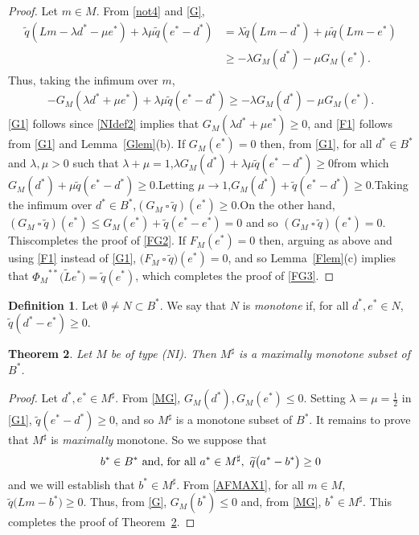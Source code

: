 \documentclass[letterpaper]{article}
\theoremstyle{plain}
\newtheorem{theorem}{Theorem}[section]
\theoremstyle{definition}
\newtheorem{definition}[theorem]{Definition}
\numberwithin{equation}{section}
\newcommand{\all}{\hbox{for all}}
\newcommand{\dbs}{^{**}}
\newcommand{\half}{{\textstyle\frac{1}{2}}}
\newcommand{\Lt}{{\wt L}}
\newcommand{\qt}{\wt q}
\newcommand{\ssquare}{\ \square\ }
\newcommand{\wt}{\widetilde}
\newcommand{\Def}{Definition~\ref}
\newcommand{\Lem}{Lemma~\ref}
\newcommand{\Thm}{Theorem~\ref}
\begin{document}
\begin{proof}
Let $m \in M$.   From \eqref{not4} and \eqref{G},
%
\begin{align*}
\qt(Lm - \lambda d^* - \mu e^*) + \lambda\mu\qt(e^* - d^*) &= \lambda\qt(Lm - d^*) + \mu\qt(Lm - e^*)\\
&\ge -\lambda G_M(d^*) - \mu G_M(e^*).
\end{align*}
%
Thus, taking the infimum over $m$,
%
\begin{align*}
-G_M(\lambda d^* + \mu e^*) + \lambda\mu\qt(e^* - d^*) \ge -\lambda G_M(d^*) - \mu G_M(e^*).
\end{align*}
%
\eqref{G1} follows since \eqref{NIdef2} implies that $G_M(\lambda d^* + \mu e^*) \ge 0$, and \eqref{F1} follows from \eqref{G1} and \Lem{Glem}(b).
If ${G_M}(e^*) = 0$ then, from \eqref{G1},  for all $d^* \in B^*$ and  $\lambda,\mu > 0$ such that $\lambda + \mu = 1$,\quad $\lambda G_M(d^*) + \lambda\mu\qt(e^* - d^*) \ge 0$\quad from which\quad $G_M(d^*) + \mu\qt(e^* - d^*) \ge 0$.\quad Letting $\mu \to 1$,\quad $G_M(d^*) + \qt(e^* - d^*) \ge 0$.\quad   Taking the infimum over $d^* \in B^*$,\quad $(G_M \ssquare \qt)(e^*) \ge 0$.\quad  On the other hand, $(G_M \ssquare \qt)(e^*) \le G_M(e^*) + \qt(e^* - e^*) = 0$ and so $(G_M \ssquare \qt)(e^*) = 0$.   This\break completes the proof of \eqref{FG2}.   If $F_M(e^*) = 0$ then, arguing as above and using  \eqref{F1} instead of \eqref{G1}, $\big(F_M \ssquare \qt\big)(e^*) = 0$, and so \Lem{Flem}(c) implies that ${\Phi_M}\dbs\big(\Lt e^*\big) = \qt(e^*)$, which completes the proof of \eqref{FG3}.    
\end{proof}
\begin{definition}\label{DUALMONdef}
Let $\emptyset \ne N \subset B^*$.  We say that $N$ is {\em monotone} if, for all $d^*,e^* \in N$, $\qt(d^* - e^*) \ge 0$.
\end{definition}
\begin{theorem}\label{AFMAXthm}
Let $M$ be of type (NI).  Then $M^\sharp$ is a maximally monotone subset of $B^*$.
\end{theorem}
%
\begin{proof}Let $d^*,e^* \in M^\sharp$.   From \eqref{MG}, $G_M(d^*),G_M(e^*) \le 0$.   Setting $\lambda = \mu = \half$ in \eqref{G1}, $\qt(e^* - d^*) \ge 0$, and so $M^\sharp$ is a monotone subset of $B^*$.  It remains to prove that $M^\sharp$ is {\em maximally} monotone.   So we suppose that   
\begin{equation*}
b^* \in B^*\hbox{ and, } \all\ a^* \in M^\sharp,\ \qt\big(a^* - b^*\big) \ge 0
\end{equation*}
%
and we will establish that $b^* \in M^\sharp$.  From  \eqref{AFMAX1}, for all $m \in M$, $\qt\big(Lm - b^*\big) \ge 0$. Thus, from \eqref{G}, $G_M(b^*) \le 0$ and, from \eqref{MG}, $b^* \in M^\sharp$.   This completes the proof of \Thm{AFMAXthm}.
\end{proof}
\end{document}
